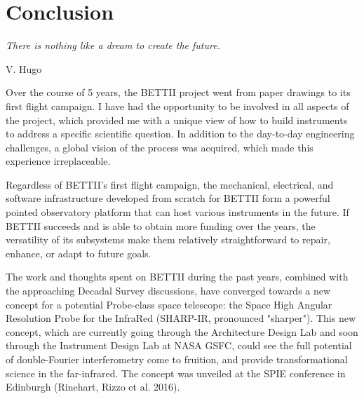
\chapter[Conclusion]{Conclusion} %
\label{chap:conclusion}


\epigraph{\small\itshape There is nothing like a dream to create the future.}{V. Hugo}


Over the course of 5 years, the BETTII project went from paper drawings to its first flight campaign. I have had the opportunity to be involved in all aspects of the project, which provided me with a unique view of how to build instruments to address a specific scientific question. In addition to the day-to-day engineering challenges, a global vision of the process was acquired, which made this experience irreplaceable.

Regardless of BETTII's first flight campaign, the mechanical, electrical, and software infrastructure developed from scratch for BETTII form a powerful pointed observatory platform that can host various instruments in the future. If BETTII succeeds and is able to obtain more funding over the years, the versatility of its subsystems make them relatively straightforward to repair, enhance, or adapt to future goals.

The work and thoughts spent on BETTII during the past years, combined with the approaching Decadal Survey discussions, have converged towards a new concept for a potential Probe-class space telescope: the Space High Angular Resolution Probe for the InfraRed (SHARP-IR, pronounced "sharper"). This new concept, which are currently going through the Architecture Design Lab and soon through the Instrument Design Lab at NASA GSFC, could see the full potential of double-Fourier interferometry come to fruition, and provide transformational science in the far-infrared. The concept was unveiled at the SPIE conference in Edinburgh (Rinehart, Rizzo et al. 2016). 




